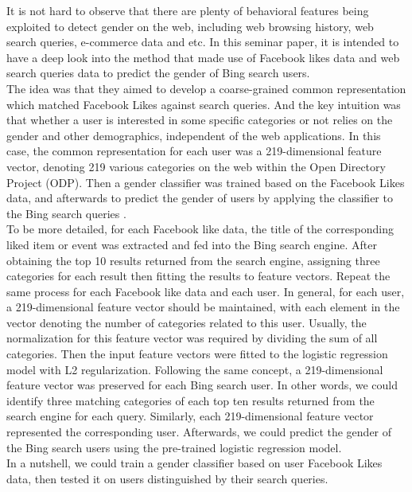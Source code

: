 \documentclass[runningheads]{llncs}
\begin{document}
    It is not hard to observe that there are plenty of behavioral features being exploited to detect gender on the web, including web browsing history, web search queries, e-commerce data and etc. In this seminar paper, it is intended to have a deep look into the method that made use of Facebook likes data and web search queries data to predict the gender of Bing search users. \\

	The idea was that they aimed to develop a coarse-grained common representation which matched Facebook Likes against search queries. And the key intuition was that whether a user is interested in some specific categories or not relies on the gender and other demographics, independent of the web applications. In this case, the common representation for each user was a 219-dimensional feature vector, denoting 219 various categories on the web within the Open Directory Project (ODP). Then a gender classifier was trained based on the Facebook Likes data, and afterwards to predict the gender of users by applying the classifier to the Bing search queries \cite{bi2013inferring}. \\
	
	To be more detailed, for each Facebook like data, the title of the corresponding liked item or event was extracted and fed into the Bing search engine. After obtaining the top 10 results returned from the search engine, assigning three categories for each result then fitting the results to feature vectors. Repeat the same process for each Facebook like data and each user. In general, for each user, a 219-dimensional feature vector should be maintained, with each element in the vector denoting the number of categories related to this user. Usually, the normalization for this feature vector was required by dividing the sum of all categories. Then the input feature vectors were fitted to the logistic regression model with L2 regularization. Following the same concept, a 219-dimensional feature vector was preserved for each Bing search user. In other words, we could identify three matching categories of each top ten results returned from the search engine for each query. Similarly, each 219-dimensional feature vector represented the corresponding user. Afterwards, we could predict the gender of the Bing search users using the pre-trained logistic regression model. \\
	
	In a nutshell, we could train a gender classifier based on user Facebook Likes data, then tested it on users distinguished by their search queries.  \\
	
\end{document}

